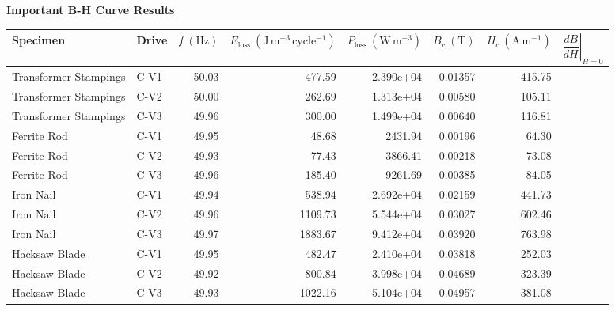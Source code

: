 \documentclass[varwidth=20cm,border=8pt]{standalone}
\begin{document}
\begin{minipage}{19cm}
\centering
{\Large \textbf{Important B-H Curve Results}}\\[0.6em]
\renewcommand{\arraystretch}{1.2}
\begin{tabular}{llrrrrrr}
\toprule
Specimen & Drive & $f~(\mathrm{Hz})$ & $E_{\mathrm{loss}}~(\mathrm{J\,m^{-3}\,cycle^{-1}})$ & $P_{\mathrm{loss}}~(\mathrm{W\,m^{-3}})$ & $B_r~(\mathrm{T})$ & $H_c~(\mathrm{A\,m^{-1}})$ & $\left.\dfrac{dB}{dH}\right|_{H=0}$ \\
\midrule
 Transformer Stampings & C-V1 & 50.03 & 477.59 & 2.390e+04 & 0.01357 & 415.75 \\
 Transformer Stampings & C-V2 & 50.00 & 262.69 & 1.313e+04 & 0.00580 & 105.11 \\
 Transformer Stampings & C-V3 & 49.96 & 300.00 & 1.499e+04 & 0.00640 & 116.81 \\
 Ferrite Rod & C-V1 & 49.95 & 48.68 & 2431.94 & 0.00196 & 64.30 \\
 Ferrite Rod & C-V2 & 49.93 & 77.43 & 3866.41 & 0.00218 & 73.08 \\
 Ferrite Rod & C-V3 & 49.96 & 185.40 & 9261.69 & 0.00385 & 84.05 \\
 Iron Nail & C-V1 & 49.94 & 538.94 & 2.692e+04 & 0.02159 & 441.73 \\
 Iron Nail & C-V2 & 49.96 & 1109.73 & 5.544e+04 & 0.03027 & 602.46 \\
 Iron Nail & C-V3 & 49.97 & 1883.67 & 9.412e+04 & 0.03920 & 763.98 \\
 Hacksaw Blade & C-V1 & 49.95 & 482.47 & 2.410e+04 & 0.03818 & 252.03 \\
 Hacksaw Blade & C-V2 & 49.92 & 800.84 & 3.998e+04 & 0.04689 & 323.39 \\
 Hacksaw Blade & C-V3 & 49.93 & 1022.16 & 5.104e+04 & 0.04957 & 381.08 \\
\bottomrule
\end{tabular}
\end{minipage}
\end{document}
